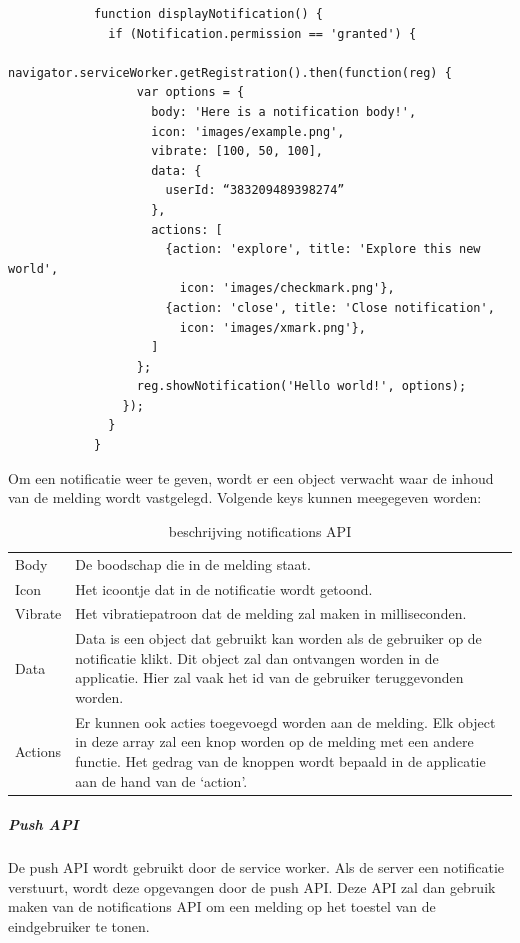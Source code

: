 			\begin{lstlisting}
			function displayNotification() {
			  if (Notification.permission == 'granted') {
			    navigator.serviceWorker.getRegistration().then(function(reg) {
			      var options = {
			        body: 'Here is a notification body!',
			        icon: 'images/example.png',
			        vibrate: [100, 50, 100],
			        data: {
			          userId: “383209489398274”
			        },
			        actions: [
			          {action: 'explore', title: 'Explore this new world',
			            icon: 'images/checkmark.png'},
			          {action: 'close', title: 'Close notification',
			            icon: 'images/xmark.png'},
			        ]
			      };
			      reg.showNotification('Hello world!', options);
			    });
			  }
			}
			\end{lstlisting}
		
		
			Om een notificatie weer te geven, wordt er een object verwacht waar de inhoud van de melding wordt vastgelegd. Volgende keys kunnen meegegeven worden:
			
			
			\begin{table}[]
			\begin{tabular}{ll}
			Body    & De boodschap die in de melding staat.\\
			Icon    & Het icoontje dat in de notificatie wordt getoond.\\
			Vibrate & Het vibratiepatroon dat de melding zal maken in milliseconden.\\
			Data    & Data is een object dat gebruikt kan worden als de gebruiker op de notificatie klikt. Dit object zal dan ontvangen worden in de applicatie. Hier zal vaak het id van de gebruiker teruggevonden worden.\\
			Actions & Er kunnen ook acties toegevoegd worden aan de melding. Elk object in deze array zal een knop worden op de melding met een andere functie. Het gedrag van de knoppen wordt bepaald in de applicatie aan de hand van de ‘action’.
			\end{tabular}
			\caption{beschrijving notifications API}
			\label{tab:notificatie code}
			\end{table}
			
			\autocite{Developers2019}
			\autocite{Mozilla2019a}
		
		
		
		\subparagraph{Push API}
		
			De push API wordt gebruikt door de service worker. Als de server een notificatie verstuurt, wordt deze opgevangen door de push API. Deze API zal dan gebruik maken van de notifications API om een melding op het toestel van de eindgebruiker te tonen.
			\autocite{Mozilla2019b}
			\autocite{Gaunt2020}
	
